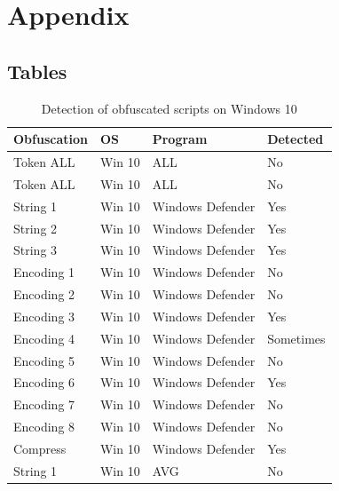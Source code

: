 \documentclass{article}%
\begin{document}
\section{Appendix}
\subsection{Tables}
\begin{table}[]
\caption {Detection of obfuscated scripts on Windows 10} \label{tab:table_one}
\begin{center}
\begin{tabular}{|l|l|l|l|}
\hline
\textbf{Obfuscation} & \textbf{OS} & \textbf{Program} & \textbf{Detected} \\ \hline
Token ALL            & Win 10      & ALL              & No                \\ \hline
Token ALL            & Win 10      & ALL              & No                \\ \hline
String 1             & Win 10      & Windows Defender & Yes               \\ \hline
String 2             & Win 10      & Windows Defender & Yes               \\ \hline
String 3             & Win 10      & Windows Defender & Yes               \\ \hline
Encoding 1           & Win 10      & Windows Defender & No                \\ \hline
Encoding 2           & Win 10      & Windows Defender & No                \\ \hline
Encoding 3           & Win 10      & Windows Defender & Yes               \\ \hline
Encoding 4           & Win 10      & Windows Defender & Sometimes         \\ \hline
Encoding 5           & Win 10      & Windows Defender & No                \\ \hline
Encoding 6           & Win 10      & Windows Defender & Yes               \\ \hline
Encoding 7           & Win 10      & Windows Defender & No                \\ \hline
Encoding 8           & Win 10      & Windows Defender & No                \\ \hline
Compress             & Win 10      & Windows Defender & Yes               \\ \hline
String 1             & Win 10      & AVG              & No                \\ \hline

\end{tabular}
\end{center}
\end{table}
\end{document}
